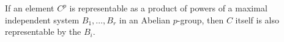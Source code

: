 If an element $C^p$ is representable as a product of powers of a maximal independent system $B_1, \ldots, B_r$ in an Abelian $p$-group, then $C$ itself is also representable by the $B_i$.
